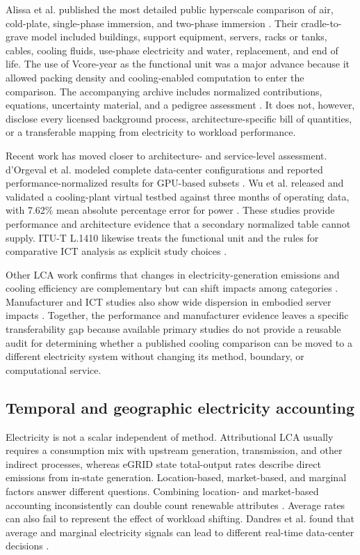 \documentclass[review,12pt]{elsarticle}
\begin{document}
Alissa et al. published the most detailed public hyperscale comparison of air, cold-plate, single-phase immersion, and two-phase immersion \cite{ref14}. Their cradle-to-grave model included buildings, support equipment, servers, racks or tanks, cables, cooling fluids, use-phase electricity and water, replacement, and end of life. The use of Vcore-year as the functional unit was a major advance because it allowed packing density and cooling-enabled computation to enter the comparison. The accompanying archive includes normalized contributions, equations, uncertainty material, and a pedigree assessment \cite{ref15}. It does not, however, disclose every licensed background process, architecture-specific bill of quantities, or a transferable mapping from electricity to workload performance.

Recent work has moved closer to architecture- and service-level assessment. d'Orgeval et al. modeled complete data-center configurations and reported performance-normalized results for GPU-based subsets \cite{ref16}. Wu et al. released and validated a cooling-plant virtual testbed against three months of operating data, with 7.62\% mean absolute percentage error for power \cite{ref17}. These studies provide performance and architecture evidence that a secondary normalized table cannot supply. ITU-T L.1410 likewise treats the functional unit and the rules for comparative ICT analysis as explicit study choices \cite{ref18}.

Other LCA work confirms that changes in electricity-generation emissions and cooling efficiency are complementary but can shift impacts among categories \cite{ref19}. Manufacturer and ICT studies also show wide dispersion in embodied server impacts \cite{ref20,ref21}. Together, the performance and manufacturer evidence leaves a specific transferability gap because available primary studies do not provide a reusable audit for determining whether a published cooling comparison can be moved to a different electricity system without changing its method, boundary, or computational service.

\subsection{Temporal and geographic electricity accounting}
Electricity is not a scalar independent of method. Attributional LCA usually requires a consumption mix with upstream generation, transmission, and other indirect processes, whereas eGRID state total-output rates describe direct emissions from in-state generation. Location-based, market-based, and marginal factors answer different questions. Combining location- and market-based accounting inconsistently can double count renewable attributes \cite{ref22,ref23}. Average rates can also fail to represent the effect of workload shifting. Dandres et al. found that average and marginal electricity signals can lead to different real-time data-center decisions \cite{ref24}.
\end{document}
